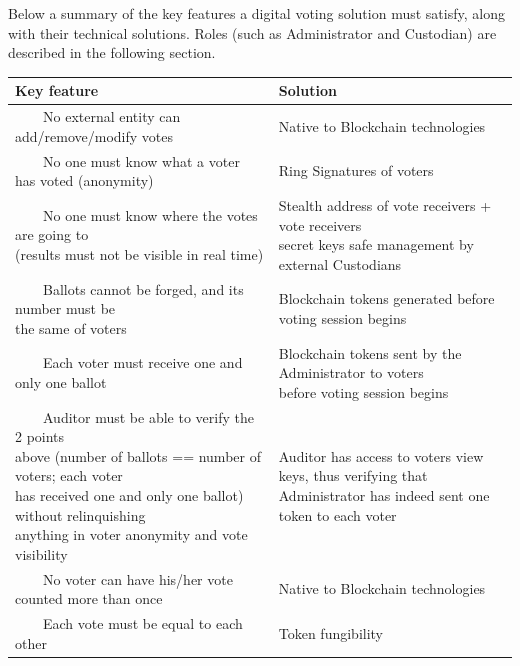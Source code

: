 \documentclass[10pt, letterpaper]{article}
\newcommand{\tabitem}{~~\llap{\textbullet}~~}
\begin{document}
Below a summary of the key features a digital voting solution must satisfy, along with their technical solutions. Roles (such as Administrator and Custodian) are described in the following section.

\begin{center}
  \begin{tabular}{ | l | l | }
    \hline
      Key feature & Solution \\ \hline
      \tabitem No external entity can add/remove/modify votes & Native to Blockchain technologies \\ \hline
      \tabitem No one must know what a voter has voted (anonymity) & Ring Signatures of voters \\ \hline
      \tabitem \makecell{No one must know where the votes are going to \\
                         (results must not be visible in real time)} & \makecell{Stealth address of vote receivers + vote receivers \\
            secret keys safe management by external Custodians} \\ \hline
      \tabitem \makecell{Ballots cannot be forged, and its number must be\\
         the same of voters} & Blockchain tokens generated before voting session begins \\ \hline
      \tabitem Each voter must receive one and only one ballot & \makecell{Blockchain tokens sent by the Administrator to voters\\
               before voting session begins} \\ \hline
      \tabitem \makecell{Auditor must be able to verify the 2 points\\
         above (number of ballots == number of voters; each voter \\
         has received one and only one ballot) without relinquishing \\
         anything in voter anonymity and vote visibility} & 
         \makecell{Auditor has access to voters view keys, thus verifying that \\
         Administrator has indeed sent one token to each voter} \\ \hline
      \tabitem No voter can have his/her vote counted more than once & Native to Blockchain technologies \\ \hline
      \tabitem Each vote must be equal to each other & Token fungibility \\ \hline
  \end{tabular}
\end{center}
\end{document}
